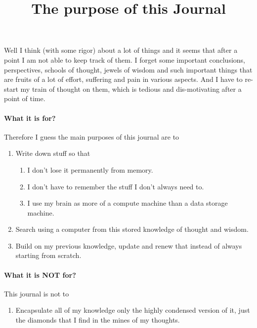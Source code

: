 \documentclass[12pt]{article}
\title{The purpose of this Journal}
\author{}
\date{}
\begin{document}
\maketitle


Well I think (with some rigor) about a lot of things and it seems that after a point I am not able to keep track of them.
I forget some important conclusions, perspectives, schools of thought, jewels of wisdom and such important things that are fruits of a lot of effort, suffering and pain in various aspects.
And I have to re-start my train of thought on them, which is tedious and dis-motivating after a point of time.

\paragraph{What it is for?}
Therefore I guess the main purposes of this journal are to
\begin{enumerate}
  \item Write down stuff so that
    \begin{enumerate}
      \item I don't lose it permanently from memory.
      \item I don't have to remember the stuff I don't always need to.
      \item I use my brain as more of a compute machine than a data storage machine.
    \end{enumerate}
  \item Search using a computer from this stored knowledge of thought and wisdom.
  \item Build on my previous knowledge, update and renew that instead of always starting from scratch.
\end{enumerate}

\paragraph{What it is NOT for?}
This journal is not to
\begin{enumerate}
  \item Encapsulate all of my knowledge only the highly condensed version of it, just the diamonds that I find in the mines of my thoughts.
\end{enumerate}
\end{document}
